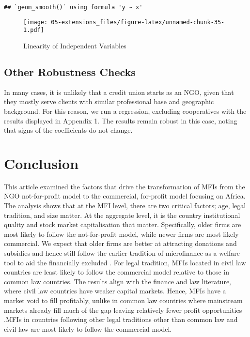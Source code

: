 \documentclass[a4paper,nobind]{templates/ociamthesis}
\begin{document}
\begin{verbatim}
## `geom_smooth()` using formula 'y ~ x'
\end{verbatim}

\begin{figure}
\centering
\texttt{[image: 05-extensions\_files/figure-latex/unnamed-chunk-35-1.pdf]}
\caption{\label{fig:unnamed-chunk-35}Linearity of Independent Variables}
\end{figure}

\elandscape

\hypertarget{other-robustness-checks}{%
\subsection{Other Robustness Checks}\label{other-robustness-checks}}

In many cases, it is unlikely that a credit union starts as an NGO, given that they mostly serve clients with similar professional base and geographic background. For this reason, we run a regression, excluding cooperatives with the results displayed in Appendix 1. The results remain robust in this case, noting that signs of the coefficients do not change.

\hypertarget{conclusion}{%
\section{Conclusion}\label{conclusion}}

This article examined the factors that drive the transformation of MFIs from the NGO not-for-profit model to the commercial, for-profit model focusing on Africa. The analysis shows that at the MFI level, there are two critical factors; age, legal tradition, and size matter. At the aggregate level, it is the country institutional quality and stock market capitalisation that matter. Specifically, older firms are most likely to follow the not-for-profit model, while newer firms are most likely commercial. We expect that older firms are better at attracting donations and subsidies and hence still follow the earlier tradition of microfinance as a welfare tool to aid the financially excluded \autocite{d2017ngos}. For legal tradition, MFIs located in civil law countries are least likely to follow the commercial model relative to those in common law countries. The results align with the finance and law literature, where civil law countries have weaker capital markets. Hence, MFIs have a market void to fill profitably, unlike in common law countries where mainstream markets already fill much of the gap leaving relatively fewer profit opportunities \autocite{la2013law,schnyder2018twenty}.MFIs in countries following other legal traditions other than common law and civil law are most likely to follow the commercial model.
\end{document}
